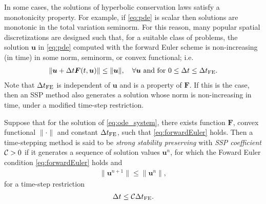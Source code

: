 In some cases, the solutions of hyperbolic conservation laws satisfy a 
monotonicity property. For example, if \eqref{eq:pde} is scalar then solutions 
are monotonic in the total variation seminorm.
For this reason, many popular spatial discretizations are designed such 
that, for a suitable class of problems, the solution $\bm{u}$ in \eqref{eq:pde}
computed with the forward Euler scheme is non-increasing (in time)
in some norm, seminorm, or convex functional; i.e.
\begin{align}\label{eq:forwardEuler}
    \|\bm{u} + \Delta t\bm{F}(t,\bm{u})\| \le \|\bm{u}\|, \quad \forall \bm{u} \text{ and for } 0 \le \Delta t \le \Delta t_{\textnormal{FE}}.
\end{align}
Note that $\Delta t_{\textnormal{FE}}$ is independent of $\bm{u}$ and is a property of $\bm{F}$.
If this is the case, then an SSP method also generates a solution whose norm is
non-increasing in time, under a modified time-step restriction. 
\begin{definition}
	Suppose that for the solution of \eqref{eq:ode_system}, there exists function $\bm{F}$, 
	convex functional $\|\cdot\|$ and constant $\Delta t_{\textnormal{FE}}$,
	 such that \eqref{eq:forwardEuler} holds.
	Then a time-stepping method is said to be \emph{strong stability
  	preserving} with \emph{SSP coefficient} $\mathcal{C} > 0$ if it
	generates a sequence of solution values $\bm{u}^n$, for which the 
	Foward Euler condition \eqref{eq:forwardEuler} holds and
	\begin{align*}
  		\|\bm{u}^{n+1}\| \le \|\bm{u}^n\|,
	\end{align*}
	for a time-step restriction
	\begin{align*}
		\Delta t \leq \mathcal{C} \Delta t_{\textnormal{FE}}.
	\end{align*}
\end{definition}


